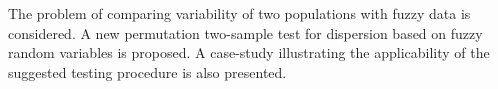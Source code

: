 
The problem of comparing variability of two populations with fuzzy data is considered. A new permutation two-sample test for dispersion based on fuzzy random variables is proposed. A case-study illustrating the applicability of the suggested testing procedure is also presented.


